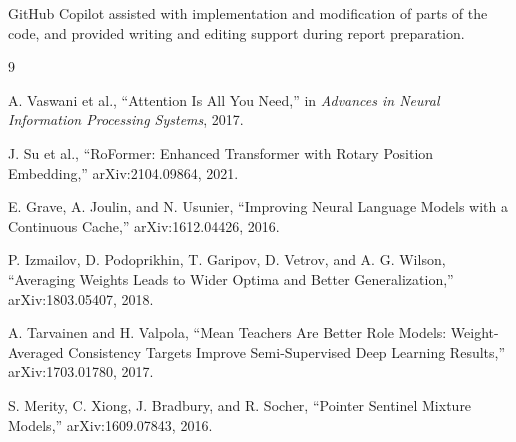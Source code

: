 \documentclass[11pt]{article}
\begin{document}
GitHub Copilot assisted with implementation and modification of parts of the code, and provided writing and editing support during report preparation.
\begin{thebibliography}{9}
\raggedright
{}
A. Vaswani et al., ``Attention Is All You Need,'' in \emph{Advances in Neural Information Processing Systems}, 2017.

J. Su et al., ``RoFormer: Enhanced Transformer with Rotary Position Embedding,'' arXiv:2104.09864, 2021.

E. Grave, A. Joulin, and N. Usunier, ``Improving Neural Language Models with a Continuous Cache,'' arXiv:1612.04426, 2016.

P. Izmailov, D. Podoprikhin, T. Garipov, D. Vetrov, and A. G. Wilson, ``Averaging Weights Leads to Wider Optima and Better Generalization,'' arXiv:1803.05407, 2018.

A. Tarvainen and H. Valpola, ``Mean Teachers Are Better Role Models: Weight-Averaged Consistency Targets Improve Semi-Supervised Deep Learning Results,'' arXiv:1703.01780, 2017.

S. Merity, C. Xiong, J. Bradbury, and R. Socher, ``Pointer Sentinel Mixture Models,'' arXiv:1609.07843, 2016.
\end{thebibliography}
\end{document}
